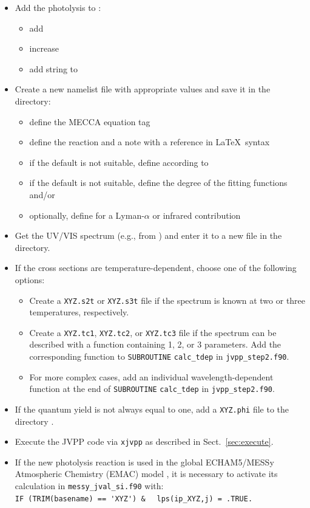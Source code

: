 \documentclass[a4paper,twoside]{article}
\def\nosep{\setlength\parsep{0mm}\setlength\topsep{0mm}\setlength\itemsep{0mm}}
\begin{document}
\begin{itemize}\nosep
\item Add the photolysis to :
  \begin{itemize}\nosep
  \item add 
  \item increase 
  \item add string to 
  \end{itemize}
\item Create a new namelist file  with appropriate values
  and save it in the  directory:
  \begin{itemize}
  \item define the MECCA equation tag 
  \item define the reaction  and a note with a reference
     in La\TeX\ syntax
  \item if the default is not suitable, define  according
    to \citet{2642}
  \item if the default is not suitable, define the degree of the fitting
    functions  and/or 
  \item optionally, define  for a Lyman-$\alpha$ or
    infrared contribution
  \end{itemize}
\item Get the UV/VIS spectrum (e.g., from \citet{2872}) and enter it to
  a new file  in the  directory.
\item If the cross sections are temperature-dependent, choose one of the
  following options:
  \begin{itemize}\nosep
  \item Create a \verb|XYZ.s2t| or \verb|XYZ.s3t| file if the spectrum
    is known at two or three temperatures, respectively.
  \item Create a \verb|XYZ.tc1|, \verb|XYZ.tc2|, or \verb|XYZ.tc3| file
    if the spectrum can be described with a function containing 1, 2, or
    3 parameters. Add the corresponding function to \verb|SUBROUTINE|
    \verb|calc_tdep| in \verb|jvpp_step2.f90|.
  \item For more complex cases, add an individual wavelength-dependent
    function at the end of \verb|SUBROUTINE| \verb|calc_tdep| in
    \verb|jvpp_step2.f90|.
  \end{itemize}
\item If the quantum yield is not always equal to one, add a
  \verb|XYZ.phi| file to the directory .
\item Execute the JVPP code via \verb|xjvpp| as described in
  Sect.~\ref{sec:execute}.
\item If the new photolysis reaction is used in the global ECHAM5/MESSy
  Atmospheric Chemistry (EMAC) model \citep{2400}, it is necessary to
  activate its calculation in \verb|messy_jval_si.f90| with:\\
  \verb|IF (TRIM(basename) == 'XYZ') &|
  \verb|  lps(ip_XYZ,j) = .TRUE.|
\end{itemize}
\end{document}
